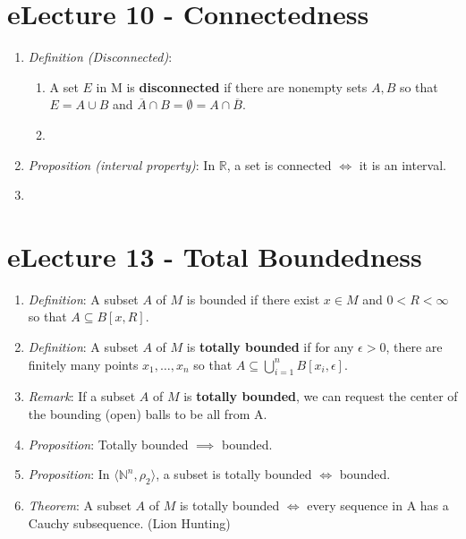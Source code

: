 \message{ !name(cheatsheet.tex)}\documentclass{article}
\begin{document}
\begin{multicols*}{3}
	\section{ eLecture 10 - Connectedness}
	\begin{enumerate}
		\item \emph{Definition (Disconnected)}:
		      \begin{enumerate}
			      \item A set \(E\) in M is \textbf{disconnected} if there are nonempty
			            sets \(A,B\) so that \(E=A\cup B\) and
			            \(\overline{A}\cap B=\emptyset=A\cap\overline{B}\).
			      \item
		      \end{enumerate}
		\item \emph{Proposition (interval property)}: In \(\mathbb{R}\), a set is connected
		      \(\iff\) it is an interval.
		\item
	\end{enumerate}

	\section{eLecture 13 - Total Boundedness}
	\begin{enumerate}
		\item \emph{Definition}: A subset \(A\) of \(M\) is bounded if there exist \(x \in M\) and \(0<R<\infty\)
		      so that \(A \subseteq B[x,R]\).
		\item \emph{Definition}: A subset \(A\) of \(M\) is \textbf{totally bounded} if for any
		      \(\epsilon > 0\), there are finitely many points \(x_1,\dots,x_n\) so that
		      \(A \subseteq \bigcup^n_{i=1}B[x_i,\epsilon]\).
		\item \emph{Remark}: If a subset \(A\) of \(M\) is \textbf{totally bounded}, we can request the
		      center of the bounding (open) balls to be all from A.
		\item \emph{Proposition}: Totally bounded \(\implies\) bounded.
		\item \emph{Proposition}: In \(\langle\mathbb{N}^n,\rho_2\rangle\), a subset is totally
		      bounded \(\iff\) bounded.
		\item \emph{Theorem}: A subset \(A\) of \(M\) is totally bounded \(\iff\) every sequence
		      in A has a Cauchy subsequence. (Lion Hunting)
	\end{enumerate}


\end{multicols*}
\end{document}
